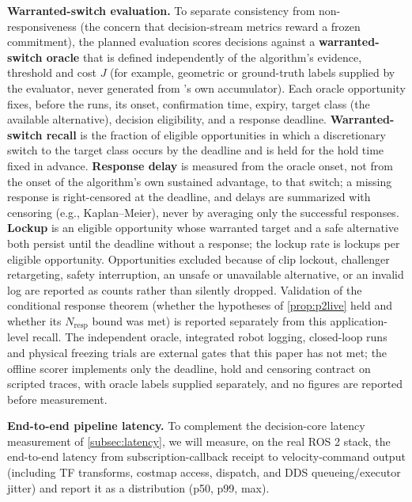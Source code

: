 \noindent\textbf{Warranted-switch evaluation.} To separate consistency from non-responsiveness (the concern that decision-stream metrics reward a frozen commitment), the planned evaluation scores decisions against a \textbf{warranted-switch oracle} that is defined independently of the algorithm's evidence, threshold and cost $J$ (for example, geometric or ground-truth labels supplied by the evaluator, never generated from \sname's own accumulator). Each oracle opportunity fixes, before the runs, its onset, confirmation time, expiry, target class (the available alternative), decision eligibility, and a response deadline. \textbf{Warranted-switch recall} is the fraction of eligible opportunities in which a discretionary switch to the target class occurs by the deadline and is held for the hold time fixed in advance. \textbf{Response delay} is measured from the oracle onset, not from the onset of the algorithm's own sustained advantage, to that switch; a missing response is right-censored at the deadline, and delays are summarized with censoring (e.g., Kaplan--Meier), never by averaging only the successful responses. \textbf{Lockup} is an eligible opportunity whose warranted target and a safe alternative both persist until the deadline without a response; the lockup rate is lockups per eligible opportunity. Opportunities excluded because of clip lockout, challenger retargeting, safety interruption, an unsafe or unavailable alternative, or an invalid log are reported as counts rather than silently dropped. Validation of the conditional response theorem (whether the hypotheses of \cref{prop:p2live} held and whether its $N_{\text{resp}}$ bound was met) is reported separately from this application-level recall. The independent oracle, integrated robot logging, closed-loop runs and physical freezing trials are external gates that this paper has not met; the offline scorer  implements only the deadline, hold and censoring contract on scripted traces, with oracle labels supplied separately, and no figures are reported before measurement.

\noindent\textbf{End-to-end pipeline latency.} To complement the decision-core latency measurement of \cref{subsec:latency}, we will measure, on the real ROS 2 stack, the end-to-end latency from subscription-callback receipt to velocity-command output (including TF transforms, costmap access,  dispatch, and DDS queueing/executor jitter) and report it as a distribution (p50, p99, max).

